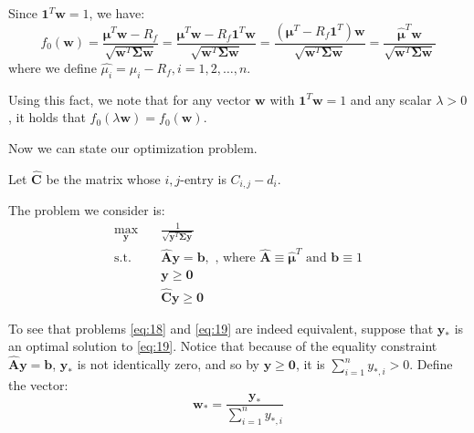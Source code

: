 \documentclass{beamer}
\begin{document}
\begin{frame}

\justifying
Since $\mathbf{1}^{T}\mathbf{w} = 1$, we have:
$$
f_{0}\left(\mathbf{w}\right) =  \frac{\boldsymbol\mu^{T} \mathbf{w} - R_{f}}{\sqrt{\mathbf{w}^{T}\mathbf{\Sigma}\mathbf{w}}} = \frac{\boldsymbol\mu^{T} \mathbf{w} - R_{f}\mathbf{1}^{T}\mathbf{w}}{\sqrt{\mathbf{w}^{T}\mathbf{\Sigma}\mathbf{w}}} = \frac{\left(\boldsymbol\mu^{T} - R_{f}\mathbf{1}^{T}\right)\mathbf{w}}{\sqrt{\mathbf{w}^{T}\mathbf{\Sigma}\mathbf{w}}} = \frac{\hat{\boldsymbol\mu}^{T}\mathbf{w}}{\sqrt{\mathbf{w}^{T}\mathbf{\Sigma}\mathbf{w}}}
$$
where we define $\hat{\mu_{i}} = \mu_{i} - R_{f}, i = 1,2,\dots,n$.

\vspace{0.8cm}
\justifying
Using this fact, we note that for any vector $\mathbf{w}$ with $\mathbf{1}^{T}\mathbf{w} = 1$ and any scalar $\lambda > 0$, it holds that $f_{0}\left(\lambda\mathbf{w}\right) = f_{0}\left(\mathbf{w}\right)$.

\vspace{0.8cm}
\justifying
Now we can state our optimization problem.

\vspace{0.8cm}
\justifying
Let $\hat{\mathbf{C}}$ be the matrix whose $i,j$-entry is $C_{i,j} - d_{i}$.

\end{frame}



\begin{frame}


\justifying
The problem we consider is:
\justifying
\begin{equation}
\begin{aligned}
\label{eq:19}
\max_{\mathbf{y}} \quad & \frac{1}{\sqrt{\mathbf{y}^{T}\mathbf{\Sigma}\mathbf{y}}} \\
\textrm{s.t.} \quad & \hat{\mathbf{A}} \mathbf{y} = \mathbf{b}, \textrm{ , where } \hat{\mathbf{A}} \equiv \hat{\boldsymbol\mu}^{T} \textrm{ and } \mathbf{b} \equiv 1  \\
                             & \mathbf{y} \geq \mathbf{0} \\
                             & \hat{\mathbf{C}}\mathbf{y} \geq \mathbf{0}
\end{aligned}
\end{equation}

\vspace{0.8cm}
\justifying
To see that problems \eqref{eq:18} and \eqref{eq:19} are indeed equivalent, suppose that $\mathbf{y}_{*}$ is an optimal solution to \eqref{eq:19}. Notice that because of the equality constraint $\hat{\mathbf{A}} \mathbf{y} = \mathbf{b}$, $\mathbf{y}_{*}$ is not identically zero, and so by $\mathbf{y} \geq \mathbf{0}$, it is $\sum_{i=1}^{n}y_{*,i} > 0$. Define the vector:
$$
\mathbf{w}_{*} =  \frac{\mathbf{y}_{*}}{\sum_{i=1}^{n}y_{*,i}}
$$


\end{frame}
\end{document}
